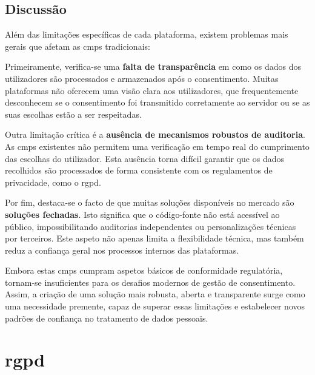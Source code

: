 \subsection{Discussão}

Além das limitações específicas de cada plataforma, existem problemas mais gerais que afetam as \acrshort{cmp}s tradicionais:

Primeiramente, verifica-se uma \textbf{falta de transparência} em como os dados dos utilizadores são processados e armazenados após o consentimento. Muitas plataformas não oferecem uma visão clara aos utilizadores, que frequentemente desconhecem se o consentimento foi transmitido corretamente ao servidor ou se as suas escolhas estão a ser respeitadas.

Outra limitação crítica é a \textbf{ausência de mecanismos robustos de auditoria}. As \acrshort{cmp}s existentes não permitem uma verificação em tempo real do cumprimento das escolhas do utilizador. Esta ausência torna difícil garantir que os dados recolhidos são processados de forma consistente com os regulamentos de privacidade, como o \acrshort{rgpd}.

Por fim, destaca-se o facto de que muitas soluções disponíveis no mercado são \textbf{soluções fechadas}. Isto significa que o código-fonte não está acessível ao público, impossibilitando auditorias independentes ou personalizações técnicas por terceiros. Este aspeto não apenas limita a flexibilidade técnica, mas também reduz a confiança geral nos processos internos das plataformas.

Embora estas \acrshort{cmp}s cumpram aspetos básicos de conformidade regulatória, tornam-se insuficientes para os desafios modernos de gestão de consentimento. Assim, a criação de uma solução mais robusta, aberta e transparente surge como uma necessidade premente, capaz de superar essas limitações e estabelecer novos padrões de confiança no tratamento de dados pessoais.


\section{\acrfull{rgpd}}

